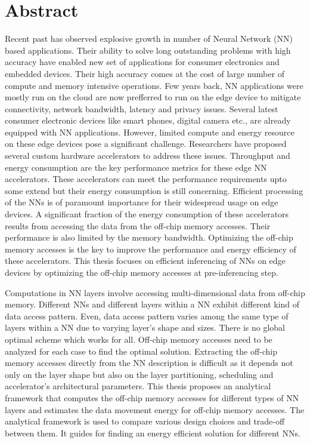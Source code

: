 \chapter*{Abstract}
Recent past has observed explosive growth in number of Neural Network (NN) based applications. Their ability to solve long outstanding problems with high accuracy have enabled new set of applications for consumer electronics and embedded devices. Their high accuracy comes at the cost of large number of compute and memory intensive operations. Few years back, NN applications were mostly run on the cloud are now prefferred to run on the edge device to mitigate connectivity, network bandwidth, latency and privacy issues. Several latest consumer electronic devices like smart phones, digital camera etc., are already equipped with NN applications. However, limited compute and energy resource on these edge devices pose a significant challenge. Researchers have proposed several custom hardware accelerators to address these issues. Throughput and energy consumption are the key performance metrics for these edge NN accelerators. These accelerators can meet the performance requirements upto some extend but their energy consumption is still concerning. Efficient processing of the NNs is of paramount importance for their widespread usage on edge devices. A significant fraction of the energy consumption of these accelerators results from accessing the data from the off-chip memory accesses. Their performance is also limited by the memory bandwidth. Optimizing the off-chip memory accesses is the key to improve the performance and energy efficiency of these accelerators. This thesis focuses on efficient inferencing of NNs on edge devices by optimizing the off-chip memory accesses at pre-inferencing step.

Computations in NN layers involve accessing multi-dimensional data from off-chip memory. Different NNs and different layers within a NN exhibit different kind of data access pattern. Even, data access pattern varies among the same type of layers within a NN due to varying layer's shape and sizes.  There is no global optimal scheme which works for all. Off-chip memory accesses need to be analyzed for each case to find the optimal solution. 
Extracting the off-chip memory accesses directly from the NN description is difficult as it depends not only on the layer shape but also on the layer partitioning, scheduling and accelerator's architectural parameters. This thesis proposes an analytical framework that computes the off-chip memory accesses for different types of NN layers and estimates the data movement energy for off-chip memory accesses. The analytical framework is used to compare various design choices and trade-off between them. It guides for finding an energy efficient solution for different NNs.

